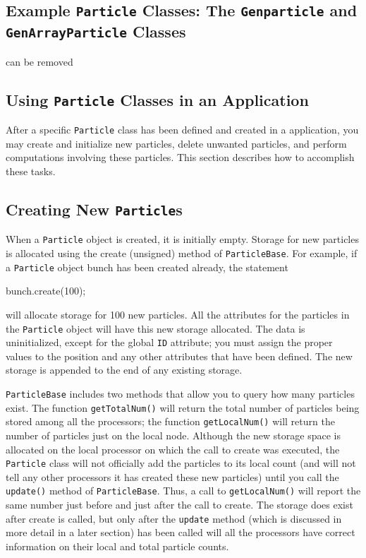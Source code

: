 \subsection{Example \texttt{Particle} Classes: {\color{red} The \texttt{Genparticle} and \texttt{GenArrayParticle}} Classes}
{\color{red} can be removed}


\subsection{Using \texttt{Particle} Classes in an Application}

After a specific \texttt{Particle} class has been defined and created in a \ippl application, you may create and initialize new particles, delete unwanted particles, and perform computations involving these particles. This section describes how to accomplish these tasks.

\subsection{Creating New \texttt{Particle}s}

When a \texttt{Particle} object is created, it is initially empty. Storage for new particles is allocated using the create (unsigned) method of \texttt{ParticleBase}. For example, if a \texttt{Particle} object bunch has been created already, the statement
\begin{smallcode}
bunch.create(100); 
\end{smallcode}


will allocate storage for 100 new particles. All the attributes for the particles in the \texttt{Particle} object will have this new storage allocated. The data is uninitialized, except for the global \texttt{ID} attribute; you must assign the proper values to the position and any other attributes that have been defined. The new storage is appended to the end of any existing storage.

\texttt{ParticleBase} includes two methods that allow you to query how many particles exist. The function \texttt{getTotalNum()} will return the total number of particles being stored among all the processors; the function \texttt{getLocalNum()} will return the number of particles just on the local node. Although the new storage space is allocated on the local processor on which the call to create was executed, the \texttt{Particle} class will not officially add the particles to its
local count (and will not tell any other processors it has created these new particles) until you call the \texttt{update()} method of \texttt{ParticleBase}. Thus, a call to \texttt{getLocalNum()} will report the same number just before and just after the call to create. The storage does exist after create is called, but only after the \texttt{update} method (which is discussed in more detail in a later section) has been called will all the processors have correct information on their local and total particle counts.

